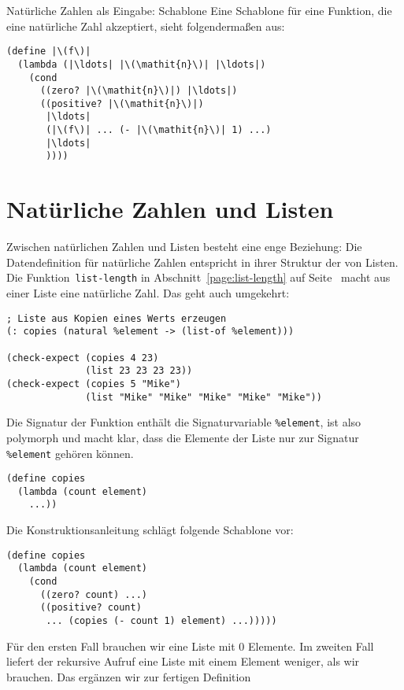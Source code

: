 \begin{konstruktionsanleitung}{Natürliche Zahlen als Eingabe: Schablone}
  \label{ka:nats-eingabe-schablone}
  Eine Schablone für eine Funktion, die eine natürliche Zahl akzeptiert, sieht
folgendermaßen aus:
%
\begin{lstlisting}
(define |\(f\)|
  (lambda (|\ldots| |\(\mathit{n}\)| |\ldots|)
    (cond
      ((zero? |\(\mathit{n}\)|) |\ldots|)
      ((positive? |\(\mathit{n}\)|)
       |\ldots|
       (|\(f\)| ... (- |\(\mathit{n}\)| 1) ...)
       |\ldots|
       ))))
\end{lstlisting}
  
\end{konstruktionsanleitung}

\section{Natürliche Zahlen und Listen}
\label{func:copies}
Zwischen natürlichen Zahlen und Listen besteht eine enge Beziehung:
Die Datendefinition für natürliche Zahlen entspricht in ihrer Struktur
der von Listen.  Die Funktion~\lstinline{list-length} in
Abschnitt~\ref{page:list-length} auf Seite~\pageref{page:list-length}
macht aus einer Liste eine natürliche Zahl.  Das geht auch umgekehrt:
%
\begin{lstlisting}
; Liste aus Kopien eines Werts erzeugen
(: copies (natural %element -> (list-of %element)))

(check-expect (copies 4 23)
              (list 23 23 23 23))
(check-expect (copies 5 "Mike")
              (list "Mike" "Mike" "Mike" "Mike" "Mike"))
\end{lstlisting}
%
Die Signatur der Funktion enthält die Signaturvariable \lstinline{%element}, ist also
polymorph und macht klar, dass die Elemente der Liste nur zur Signatur
\lstinline{%element} gehören können.
%
\begin{lstlisting}
(define copies
  (lambda (count element)
    ...))
\end{lstlisting}
%
Die Konstruktionsanleitung schlägt folgende Schablone vor:
%
\begin{lstlisting}
(define copies
  (lambda (count element)
    (cond
      ((zero? count) ...)
      ((positive? count)
       ... (copies (- count 1) element) ...)))))
\end{lstlisting}
%
Für den ersten Fall brauchen wir eine Liste mit 0 Elemente.  Im
zweiten Fall liefert der rekursive Aufruf eine Liste mit einem Element
weniger, als wir brauchen. Das ergänzen wir zur fertigen Definition
